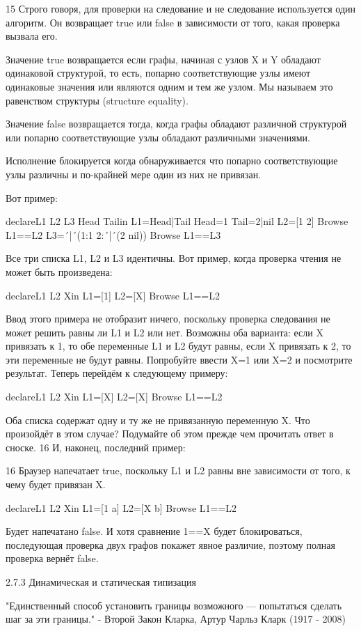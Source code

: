 15 Строго говоря, для проверки на следование и не следование используется один алгоритм. Он возвращает true или false в зависимости от того, какая проверка вызвала его.

Значение true возвращается если графы, начиная с узлов X и Y обладают одинаковой структурой, то есть, попарно соответствующие узлы имеют одинаковые значения или являются одним и тем же узлом. Мы называем это равенством структуры (structure equality).

Значение false возвращается тогда, когда графы обладают различной структурой или попарно соответствующие узлы обладают различными значениями.

Исполнение блокируется когда обнаруживается что попарно соответствующие узлы различны и по-крайней мере один из них не привязан.

Вот пример:

declareL1 L2 L3 Head Tailin
L1=Head|Tail
Head=1
Tail=2|nil
L2=[1 2]
{Browse L1==L2}
L3=´|´(1:1 2:´|´(2 nil))
{Browse L1==L3}

Все три списка L1, L2 и L3 идентичны. Вот пример, когда проверка чтения не может быть произведена:

declareL1 L2 Xin
L1=[1]
L2=[X]
{Browse L1==L2}

Ввод этого примера не отобразит ничего, поскольку проверка следования не может решить равны ли L1 и L2 или нет. Возможны оба варианта: если X привязать к 1, то обе переменные L1 и L2 будут равны, если X привязать к 2, то эти переменные не будут равны. Попробуйте ввести X=1 или X=2 и посмотрите результат. Теперь перейдём к следующему примеру:

declareL1 L2 Xin
L1=[X]
L2=[X]
{Browse L1==L2}

Оба списка содержат одну и ту же не привязанную переменную X. Что произойдёт в этом случае? Подумайте об этом прежде чем прочитать ответ в сноске. 16 И, наконец, последний пример:

16 Браузер напечатает true, поскольку L1 и L2 равны вне зависимости от того, к чему будет привязан X.

declareL1 L2 Xin
L1=[1 a]
L2=[X b]
{Browse L1==L2}

Будет напечатано false. И хотя сравнение 1==X будет блокироваться, последующая проверка двух графов покажет явное различие, поэтому полная проверка вернёт false.

2.7.3 Динамическая и статическая типизация

"Единственный способ установить границы возможного — попытаться сделать шаг за эти границы."
- Второй Закон Кларка, Артур Чарльз Кларк (1917 - 2008)

